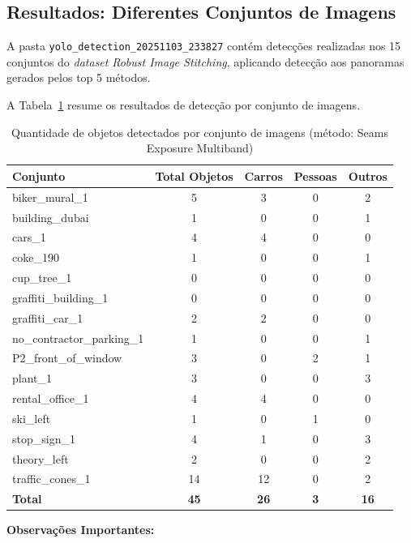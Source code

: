 \subsection{Resultados: Diferentes Conjuntos de Imagens}

A pasta \texttt{yolo\_detection\_20251103\_233827} contém detecções realizadas nos 15 conjuntos do \textit{dataset} \textit{Robust Image Stitching}, aplicando detecção aos panoramas gerados pelos top 5 métodos.

A Tabela~\ref{tab:detection-by-dataset} resume os resultados de detecção por conjunto de imagens.

\begin{table}[htb]
\centering
\caption{Quantidade de objetos detectados por conjunto de imagens (método: Seams Exposure Multiband)}
\label{tab:detection-by-dataset}
\small
\begin{tabular}{lcccc}
\hline
\textbf{Conjunto} & \textbf{Total Objetos} & \textbf{Carros} & \textbf{Pessoas} & \textbf{Outros} \\ \hline
biker\_mural\_1 & 5 & 3 & 0 & 2 \\
building\_dubai & 1 & 0 & 0 & 1 \\
cars\_1 & 4 & 4 & 0 & 0 \\
coke\_190 & 1 & 0 & 0 & 1 \\
cup\_tree\_1 & 0 & 0 & 0 & 0 \\
graffiti\_building\_1 & 0 & 0 & 0 & 0 \\
graffiti\_car\_1 & 2 & 2 & 0 & 0 \\
no\_contractor\_parking\_1 & 1 & 0 & 0 & 1 \\
P2\_front\_of\_window & 3 & 0 & 2 & 1 \\
plant\_1 & 3 & 0 & 0 & 3 \\
rental\_office\_1 & 4 & 4 & 0 & 0 \\
ski\_left & 1 & 0 & 1 & 0 \\
stop\_sign\_1 & 4 & 1 & 0 & 3 \\
theory\_left & 2 & 0 & 0 & 2 \\
traffic\_cones\_1 & 14 & 12 & 0 & 2 \\
\hline
\textbf{Total} & \textbf{45} & \textbf{26} & \textbf{3} & \textbf{16} \\
\hline
\end{tabular}
\end{table}

\textbf{Observações Importantes:}


